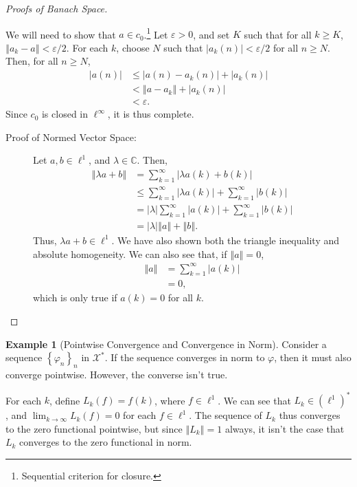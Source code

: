 \documentclass[10pt]{extarticle}
\newcommand{\C}{\mathbb{C}}
\newcommand{\norm}[1]{\left\Vert #1\right\Vert}
\newcommand{\set}[1]{\left\{#1\right\}}
\newcommand{\ve}{\varepsilon}
\theoremstyle{plain}
\theoremstyle{definition}
\newtheorem*{example}{Example}
\theoremstyle{note}
\renewcommand{\newline}{\hfill\break}
\begin{document}
\begin{proof}[Proofs of Banach Space]
\begin{description}[font = \normalfont]
\begin{description}
          We will need to show that $a\in c_0$.\footnote{Sequential criterion for closure.} Let $\ve > 0$, and set $K$ such that for all $k\geq K$, $\norm{a_k - a} < \ve/2$. For each $k$, choose $N$ such that $|a_k(n)| < \ve/2$ for all $n \geq N$. Then, for all $n\geq N$,
          \begin{align*}
            \left\vert a(n) \right\vert &\leq \left\vert a(n) - a_k(n) \right\vert + \left\vert a_k(n) \right\vert\\
                                        &< \norm{a - a_k} + \left\vert a_k(n) \right\vert\\
                                        &< \ve.
          \end{align*}
          Since $c_0$ is closed in $\ell^{\infty}$, it is thus complete.
      \end{description}
    \item[$\ell^{1}$:]\hfill
      \begin{description}
        \item[Proof of Normed Vector Space:] Let $a,b\in \ell^{1}$, and $\lambda \in \C$. Then,
          \begin{align*}
            \norm{\lambda a + b} &= \sum_{k=1}^{\infty}\left\vert \lambda a(k) + b(k) \right\vert\\
                                 &\leq \sum_{k=1}^{\infty}\left\vert \lambda a(k) \right\vert + \sum_{k=1}^{\infty}\left\vert b(k) \right\vert\\
                                 &= |\lambda|\sum_{k=1}^{\infty}\left\vert a(k) \right\vert + \sum_{k=1}^{\infty}\left\vert b(k) \right\vert\\
                                 &= |\lambda|\norm{a} + \norm{b}.
          \end{align*}
          Thus, $\lambda a + b\in \ell^{1}$. We have also shown both the triangle inequality and absolute homogeneity. We can also see that, if $\norm{a} = 0$,
          \begin{align*}
            \norm{a} &= \sum_{k=1}^{\infty}\left\vert a(k) \right\vert\\
            &= 0,
          \end{align*}
          which is only true if $a(k) = 0$ for all $k$.
      \end{description}
  \end{description}
\end{proof}
\begin{example}[Pointwise Convergence and Convergence in Norm]
  Consider a sequence $\set{\varphi_n}_n$ in $\mathcal{X}^{\ast}$. If the sequence converges in norm to $\varphi$, then it must also converge pointwise. However, the converse isn't true.\newline

  For each $k$, define $L_k(f) = f(k)$, where $f\in \ell^{1}$. We can see that $L_k \in \left(\ell^{1}\right)^{\ast}$, and $\lim_{k\rightarrow\infty}L_k(f) = 0$ for each $f\in \ell^{1}$. The sequence of $L_k$ thus converges to the zero functional pointwise, but since $\norm{L_k} = 1$ always, it isn't the case that $L_k$ converges to the zero functional in norm.
\end{example}
\end{document}
